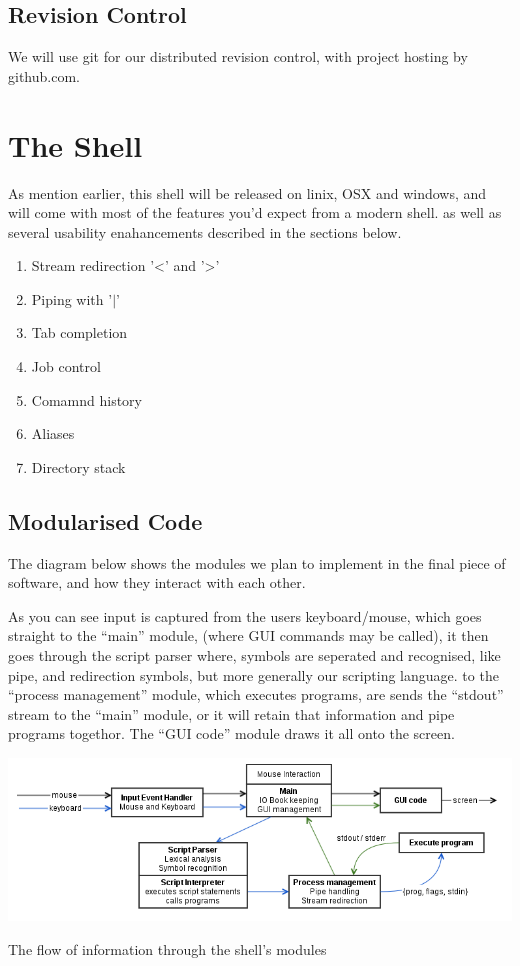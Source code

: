 \documentclass[a4paper,11pt]{article}
\begin{document}
\subsection*{Revision Control}
We will use git for our distributed revision control, with project hosting by github.com.

\section{The Shell}

As mention earlier, this shell will be released on linix, OSX and windows, and will come with most of the features you'd expect from a modern shell. as well as several usability enahancements described in the sections below.
\begin{enumerate}
\item Stream redirection '\textless' and '\textgreater'
\item Piping with '\(\vert\)'
\item Tab completion
\item Job control
\item Comamnd history
\item Aliases
\item Directory stack
\end{enumerate}

\subsection*{Modularised Code}

The diagram below shows the modules we plan to implement in the final piece of software, and how they interact with each other.

As you can see input is captured from the users keyboard/mouse, which goes straight to the ``main'' module, (where GUI commands may be called), it then goes through the script parser where, symbols are seperated and recognised, like pipe, and redirection symbols, but more generally our scripting language. to the ``process management'' module, which executes programs, are sends the ``stdout'' stream to the ``main'' module, or it will retain that information and pipe programs togethor. The ``GUI code'' module draws it all onto the screen. 

\begin{center}\includegraphics[width=16cm]{shellflow.png}

The flow of information through the shell's modules\end{center}
\end{document}
